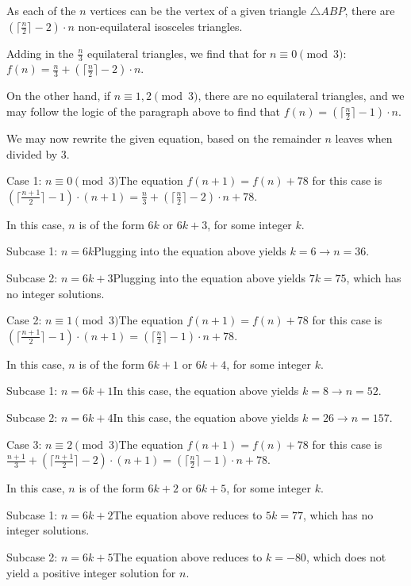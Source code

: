 \begin{enumerate}
 As each of the $n$ vertices can be the vertex of a given triangle $\triangle ABP$, there are $\left(\lceil \frac{n}{2} \rceil -2 \right)\cdot n$ non-equilateral isosceles triangles.

 Adding in the $\frac{n}{3}$ equilateral triangles, we find that for $n\equiv 0\pmod 3$: $f(n) = \frac{n}{3}+\left(\lceil \frac{n}{2} \rceil -2\right)\cdot n$.

 On the other hand, if $n\equiv 1, 2\pmod 3$, there are no equilateral triangles, and we may follow the logic of the paragraph above to find that $f(n)=\left(\lceil \frac{n}{2} \rceil -1\right)\cdot n$.

 We may now rewrite the given equation, based on the remainder $n$ leaves when divided by 3.

 
Case 1: $n\equiv 0\pmod 3$The equation $f(n+1)=f(n)+78$ for this case is $\left(\lceil \frac{n+1}{2} \rceil -1\right)\cdot (n+1)=\frac{n}{3}+\left(\lceil \frac{n}{2} \rceil -2\right)\cdot n+78$.

 In this case, $n$ is of the form $6k$ or $6k+3$, for some integer $k$.

 Subcase 1: $n=6k$Plugging into the equation above yields $k=6\rightarrow n=36$.

 Subcase 2: $n=6k+3$Plugging into the equation above yields $7k=75$, which has no integer solutions.

 Case 2: $n\equiv 1\pmod 3$The equation $f(n+1)=f(n)+78$ for this case is $\left(\lceil \frac{n+1}{2} \rceil -1\right)\cdot (n+1)=\left(\lceil \frac{n}{2} \rceil -1\right)\cdot n+78$.

 In this case, $n$ is of the form $6k+1$ or $6k+4$, for some integer $k$.

 Subcase 1: $n=6k+1$In this case, the equation above yields $k=8\rightarrow n=52$.

 Subcase 2: $n=6k+4$In this case, the equation above yields $k=26\rightarrow n=157$.

 Case 3: $n\equiv 2\pmod 3$The equation $f(n+1)=f(n)+78$ for this case is $\frac{n+1}{3}+\left(\lceil \frac{n+1}{2} \rceil -2\right)\cdot (n+1)=\left(\lceil \frac{n}{2} \rceil -1\right)\cdot n+78$.

 In this case, $n$ is of the form $6k+2$ or $6k+5$, for some integer $k$.

 Subcase 1: $n=6k+2$The equation above reduces to $5k=77$, which has no integer solutions.

 Subcase 2: $n=6k+5$The equation above reduces to $k=-80$, which does not yield a positive integer solution for $n$.


\end{enumerate}
